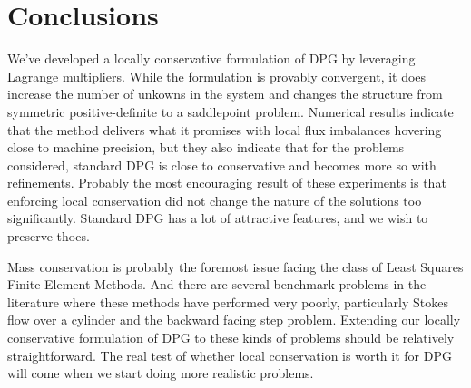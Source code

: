 \documentclass[letterpaper]{article}
\begin{document}
\section{Conclusions}
We've developed a locally conservative formulation of DPG by leveraging
Lagrange multipliers. While the formulation is provably convergent, it does
increase the number of unkowns in the system and changes the structure from
symmetric positive-definite to a saddlepoint problem. Numerical results
indicate that the method delivers what it promises with local flux imbalances
hovering close to machine precision, but they also indicate that for the
problems considered, standard DPG is close to conservative and becomes more so
with refinements. Probably the most encouraging result of these experiments is
that enforcing local conservation did not change the nature of the solutions
too significantly. Standard DPG has a lot of attractive features, and we wish
to preserve thoes.

Mass conservation is probably the foremost issue facing the class of Least
Squares Finite Element Methods. And there are several benchmark problems in the
literature where these methods have performed very poorly, particularly Stokes
flow over a cylinder and the backward facing step problem. Extending our locally
conservative formulation of DPG to these kinds of problems should be
relatively straightforward. The real test of whether local conservation is
worth it for DPG will come when we start doing more realistic problems.



\end{document}
